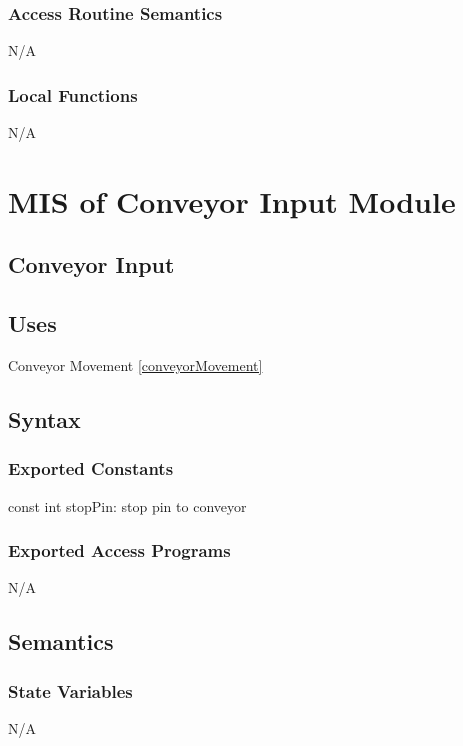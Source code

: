 \documentclass[12pt, titlepage]{article}
\begin{document}
\subsubsection{Access Routine Semantics}

N/A

\subsubsection{Local Functions}

N/A

\section{MIS of Conveyor Input Module} \label{conveyorInput} 



\subsection{Conveyor Input}


\subsection{Uses}
Conveyor Movement \ref{conveyorMovement}

\subsection{Syntax}
\subsubsection{Exported Constants}
const int stopPin: stop pin to conveyor\\
\subsubsection{Exported Access Programs}

N/A

\subsection{Semantics}

\subsubsection{State Variables}

N/A
\end{document}
